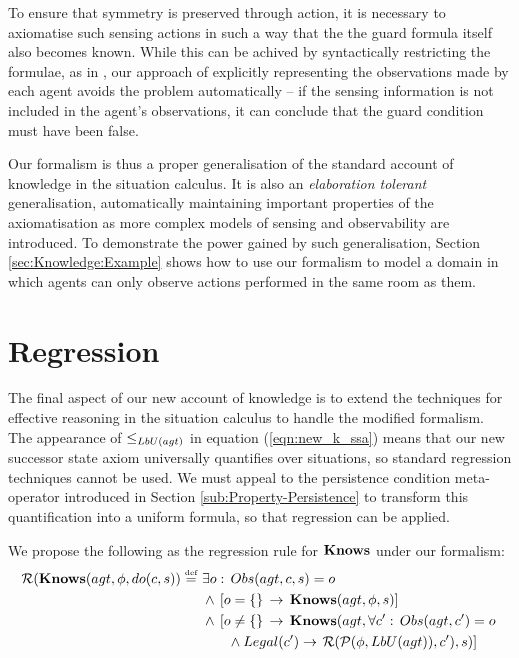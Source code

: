 To ensure that symmetry is preserved through action, it is necessary
to axiomatise such sensing actions in such a way that the the guard
formula itself also becomes known. While this can be achived by syntactically
restricting the formulae, as in \citep{Petrick06thesis}, our approach
of explicitly representing the observations made by each agent avoids
the problem automatically -- if the sensing information is not included
in the agent's observations, it can conclude that the guard condition
must have been false.

Our formalism is thus a proper generalisation of the standard account
of knowledge in the situation calculus. It is also an \emph{elaboration
tolerant} generalisation, automatically maintaining important properties
of the axiomatisation as more complex models of sensing and observability
are introduced. To demonstrate the power gained by such generalisation,
Section \ref{sec:Knowledge:Example} shows how to use our formalism
to model a domain in which agents can only observe actions performed
in the same room as them.


\section{Regression\label{sec:Knowledge:Regression}}

The final aspect of our new account of knowledge is to extend the
techniques for effective reasoning in the situation calculus to handle
the modified formalism. The appearance of $\leq_{LbU(agt)}$ in equation
(\ref{eqn:new_k_ssa}) means that our new successor state axiom universally
quantifies over situations, so standard regression techniques cannot
be used. We must appeal to the persistence condition meta-operator
introduced in Section \ref{sub:Property-Persistence} to transform
this quantification into a uniform formula, so that regression can
be applied.

We propose the following as the regression rule for $\mathbf{Knows}$ under
our formalism:\begin{align}
\mathcal{R}(\mathbf{Knows}(agt,\phi,do(c,s))\stackrel{\mbox{\tiny def}}{=}\,\, & \exists o:\, Obs(agt,c,s)=o\nonumber \\
 & \wedge\,\left[o=\{\}\,\rightarrow\,\mathbf{Knows}(agt,\phi,s)\right]\nonumber \\
 & \wedge\,\left[o\neq\{\}\,\rightarrow\,\mathbf{Knows}(agt,\forall c':\, Obs(agt,c')=o\right.\nonumber \\
 & \,\,\,\,\,\,\,\,\,\,\,\wedge Legal(c')\rightarrow\left.\mathcal{R}(\mathcal{P}(\phi,LbU(agt)),c'),s)\right]\label{eqn:R_do_c_s}\end{align}



